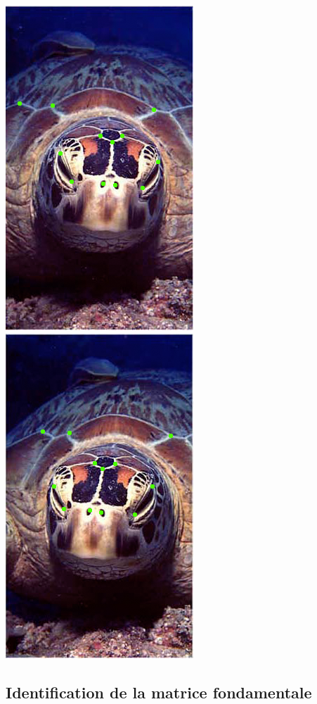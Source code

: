 \documentclass[a4paper,12pt]{article}
\begin{document}
\begin{center}
\includegraphics[scale=0.5]{TurtleD1.png}\hspace{0.2cm}
\includegraphics[scale=0.5]{TurtleG1.png}
\end{center}
\vspace{0.5cm}

\subsection{Identification de la matrice fondamentale}
\end{document}
